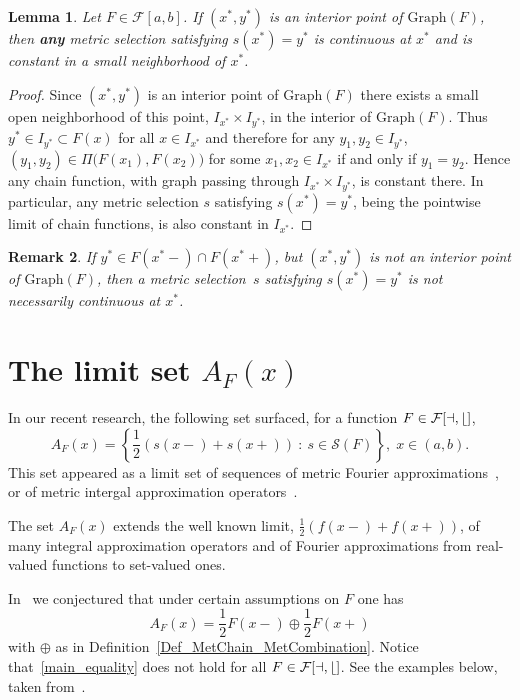 \documentclass[final,3p,mathptmx]{article}%
\newcommand{\Graph}{{\mathrm{Graph}}}
\newcommand{\Pair}[2]{\Pi \big ( {#1},{#2} \big )}
\newcommand{\calF}{\cal{F}[a,b]}
\newcommand{\setMS}{\mathcal{S}(F)}
\newtheorem{remark}{Remark}[section]
\newtheorem{lemma}[remark]{Lemma}
\begin{document}
{{{{\begin{lemma}\label{lemma_contin}
 Let $F \in \mathcal{F}[a,b]$. If $(x^*, y^*)$ is an interior point of $\Graph(F)$, then {\bf any} metric selection satisfying  $s(x^*)=y^*$ is continuous at $x^*$ and is constant in a small neighborhood of $x^*$.
\end{lemma}

\begin{proof}
Since  $(x^*, y^*)$ is an interior point of $\Graph(F)$ there exists a small open neighborhood of this point, ${I_{x^*}\times I_{y^*}}$, in the interior  of $\Graph(F)$. Thus $y^* \in I_{y^*} \subset F(x)$ for all $x \in I_{x^*}$ and
therefore for any ${ y_1, y_2 \in I_{y^*} }$, $(y_1, y_2) \in \Pair{F(x_1)}{F(x_2)}$ for some $x_1, x_2 \in I_{x^*}$ if and only if $y_1=y_2$. Hence any chain function, with graph passing through $I_{x^*}\times I_{y^*}$, is constant there. In particular, any metric selection $s$ satisfying $s(x^*)=y^*$, being the pointwise limit of chain functions, is also constant in $I_{x^*}$.
\end{proof}

\begin{remark}\label{Remark_Cont_2}
If $y^* \in F(x^*-)\cap F(x^*+)$, but $(x^*, y^*)$ is not an interior point of $\Graph(F)$, then a metric selection~$s$ satisfying $s(x^*)=y^*$ is not necessarily continuous at $x^*$.
\end{remark}




\section{The limit set $A_{F}(x)$}\label{Sect_LimitSet}

In our recent research, the following set surfaced, for a function $F \in \calF$,
$$
A_{F}(x) =\left \{ \frac{1}{2} \left( s(x-) + s(x+) \right) \ : \ s \in \setMS \right \} , \; x \in (a,b).
$$
This set appeared as a limit set of sequences of metric Fourier approximations~\cite{BDFM:2021}, or of metric intergal approximation operators~\cite{BDFM:2022}. 

The set $A_{F}(x)$ extends the well known limit, $\frac{1}{2} \left( f(x-) + f(x+) \right)$, of many integral approximation operators and of Fourier approximations from real-valued functions to set-valued ones.

In~\cite{BDFM:2021} we conjectured that under certain assumptions on $F$ one has
\begin{equation} \label{main_equality}
A_F(x) = \frac{1}{2} F(x-)\oplus \frac{1}{2} F(x+)
\end{equation}
with $\oplus$ as in Definition~\ref{Def_MetChain_MetCombination}.
Notice that~\eqref{main_equality} does not hold for all $F \in \calF$. See the examples below, taken from~\cite[Section~7]{BDFM:2021}.


}}}}
\end{document}
